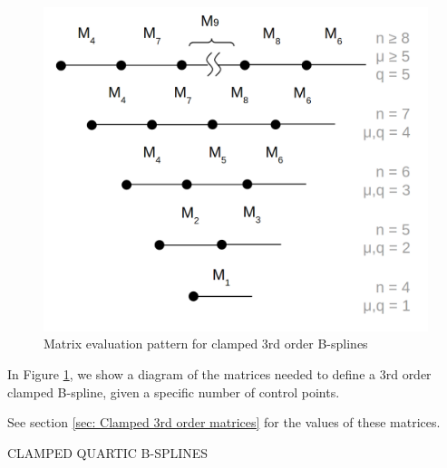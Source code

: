 \documentclass{article}
\begin{document}
\begin{figure}[H]
\begin{center}
\includegraphics[scale=.24]{Clamped3rdOrderMatrixPattern.png}
\end{center}
\caption{Matrix evaluation pattern for clamped 3rd order B-splines}
\label{Fig:Clamped 3rd Order}
\end{figure}

    In Figure \ref{Fig:Clamped 3rd Order}, we show a diagram of the matrices needed to define a 3rd order clamped B-spline, given a specific number of control points.

See section \ref{sec: Clamped 3rd order matrices} for the values of these matrices.

\hspace{1cm}

\noindent CLAMPED QUARTIC B-SPLINES

\hspace{1cm}
\end{document}
